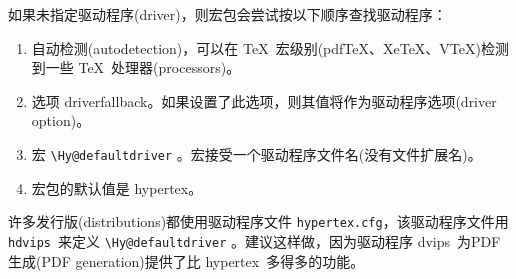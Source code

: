 \documentclass{article}
\newcommand*{\cs}[1]{%
  \texttt{\textbackslash #1}%
}
\begin{document}
如果未指定驱动程序(driver)，则宏包会尝试按以下顺序查找驱动程序：
\begin{enumerate}
    \item 自动检测(autodetection)，可以在 \TeX\ 宏级别(pdf\TeX、Xe\TeX、V\TeX)检测到一些 \TeX\ 处理器(processors)。
    \item 选项 \textsf{driverfallback}。如果设置了此选项，则其值将作为驱动程序选项(driver option)。
    \item 宏 \cs{Hy@defaultdriver}。宏接受一个驱动程序文件名(没有文件扩展名)。
    \item 宏包的默认值是 \textsf{hypertex}。
\end{enumerate}
许多发行版(distributions)都使用驱动程序文件 \texttt{hypertex.cfg}，该驱动程序文件用 \texttt{hdvips}\ 来定义 \cs{Hy@defaultdriver}。建议这样做，因为驱动程序 \textsf{dvips}\ 为PDF生成(PDF generation)提供了比 \textsf{hypertex}\ 多得多的功能。
\end{document}

